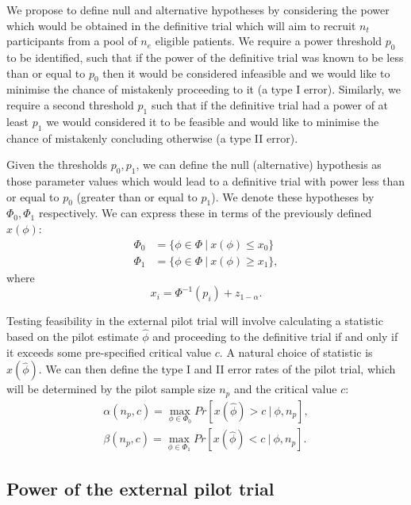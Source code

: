 \documentclass[AMA,STIX1COL]{WileyNJD-v2}
\begin{document}
We propose to define null and alternative hypotheses by considering the power which would be obtained in the definitive trial which will aim to recruit $n_t$ participants from a pool of $n_e$ eligible patients. We require a power threshold $p_0$ to be identified, such that if the power of the definitive trial was known to be less than or equal to $p_0$ then it would be considered infeasible and we would like to minimise the chance of mistakenly proceeding to it (a type I error). Similarly, we require a second threshold $p_1$ such that if the definitive trial had a  power of at least $p_1$ we would considered it to be feasible and would like to minimise the chance of mistakenly concluding otherwise (a type II error). 

Given the thresholds $p_0, p_1$, we can define the null (alternative) hypothesis as those parameter values which would lead to a definitive trial with power less than or equal to $p_0$ (greater than or equal to $p_1$). We denote these hypotheses by $\Phi_0, \Phi_1$ respectively. We can express these in terms of the previously defined $x(\phi)$:
\begin{align*}
\Phi_0 &= \{\phi \in \Phi ~ | ~ x(\phi) \leq x_0 \} \\
\Phi_1 &= \{\phi \in \Phi ~ | ~ x(\phi) \geq x_1 \},
\end{align*}
where
$$
x_i = \Phi^{-1}(p_i) + z_{1-\alpha}.
$$

Testing feasibility in the external pilot trial will involve calculating a statistic based on the pilot estimate $\hat{\phi}$ and proceeding to the definitive trial if and only if it exceeds some pre-specified critical value $c$. A natural choice of statistic is $x(\hat{\phi})$. We can then define the type I and II error rates of the pilot trial, which will be determined by the pilot sample size $n_p$ and the critical value $c$:
\begin{align*}
\alpha(n_p, c) = \max_{\phi \in \Phi_0} Pr[ x(\hat{\phi}) > c ~ | ~ \phi, n_p], \\
\beta(n_p, c) = \max_{\phi \in \Phi_1} Pr[ x(\hat{\phi}) < c ~ | ~ \phi, n_p].
\end{align*}

\subsection{Power of the external pilot trial}
\end{document}
